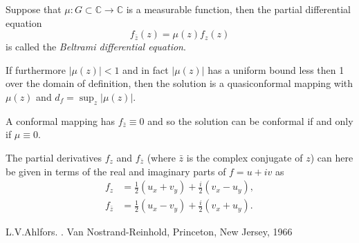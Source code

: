 \documentclass[12pt]{article}
\begin{document}
Suppose that $\mu : G \subset {\mathbb{C}} \rightarrow {\mathbb{C}}$ is a measurable function, then the partial differential equation
\begin{equation*}
f_{\bar{z}}(z) = \mu(z)f_z(z)
\end{equation*}
is called the {\em Beltrami differential equation}.

If furthermore $\lvert \mu(z) \rvert < 1$ and
in fact $\lvert \mu(z) \rvert$ has a uniform bound less then 1 over the domain of definition, then the solution is a quasiconformal mapping with  $\mu(z)$ and  $d_f = \sup_z \lvert \mu(z) \rvert$.

A conformal mapping has $f_{\bar{z}} \equiv 0$ and so the solution can be conformal if and only if $\mu \equiv 0$.

The partial derivatives $f_z$ and $f_{\bar{z}}$ (where $\bar{z}$ is the complex conjugate of $z$) can here be given in terms of
the real and imaginary parts of $f = u + iv$ as
\begin{align*}
f_z & = \frac{1}{2} ( u_x + v_y ) + \frac{i}{2} ( v_x - u_y ),
\\
f_{\bar{z}} & = \frac{1}{2} ( u_x - v_y ) + \frac{i}{2} ( v_x + u_y ).
\end{align*}

\begin{thebibliography}{9}
L.\@ V.\@ Ahlfors.  \emph{}.  Van Nostrand-Reinhold, Princeton, New Jersey, 1966
\end{thebibliography}
\end{document}
